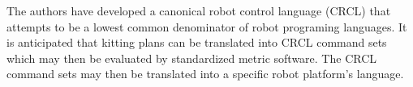 The authors have developed a canonical robot control language (CRCL) that
attempts to be a lowest common denominator of robot programing languages.
It is anticipated that kitting plans can be translated into CRCL command
sets which may then be evaluated by standardized metric software. The CRCL
command sets may then be translated into a specific robot platform's
language.
